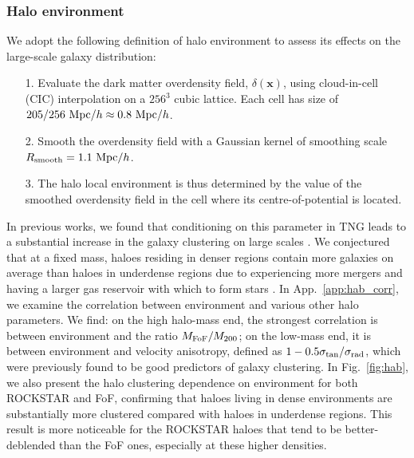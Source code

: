 \documentclass[fleqn,usenatbib]{mnras}
\newcommand{\rss}[1]{\textcolor{purple}{(rss: #1)}}
\begin{document}
\subsubsection{Halo environment}
We adopt the following definition of halo environment to assess its effects on the large-scale galaxy distribution:
\begin{itemize}
\item[1.] Evaluate the dark matter overdensity field, $\delta (\mathbf{x})$, using cloud-in-cell (CIC) interpolation on a $256^3$ cubic lattice. Each cell has size of $205/256 \ {\rm Mpc}/h \approx 0.8 \ {\rm Mpc}/h$.
\item[2.] Smooth the overdensity field with a Gaussian kernel of smoothing scale $R_{\rm smooth} = 1.1 \ {\rm Mpc}/h$.
\item[3.] The halo local environment is thus determined by the value of the smoothed overdensity field in the cell where its centre-of-potential is located.
\end{itemize}
In previous works, we found that conditioning on this parameter in TNG leads to a substantial increase in the galaxy clustering on large scales \citep{2020MNRAS.493.5506H,2021MNRAS.501.1603H}. We conjectured that at a fixed mass, haloes residing in denser regions contain more galaxies on average than haloes in underdense regions due to experiencing more mergers and having a larger gas reservoir with which to form stars \citep{2007MNRAS.378..641A,2017A&A...598A.103P,2018MNRAS.476.5442P,2018MNRAS.473.2486S}. In App.~\ref{app:hab_corr}, we examine the correlation between environment and various other halo parameters. We find: on the high halo-mass end, the strongest correlation is between environment and the ratio $M_{\rm FoF}/M_{\rm 200}$; 
on the low-mass end, it is between environment and velocity anisotropy, defined as $1-0.5\sigma_{\rm tan}/\sigma_{\rm rad}$, which were previously found to be good predictors of galaxy clustering. In Fig.~\ref{fig:hab}, we also present the halo clustering dependence on environment for both \textsc{ROCKSTAR} and FoF, confirming that haloes living in dense environments are substantially more clustered compared with haloes in underdense regions. This result is more noticeable for the \textsc{ROCKSTAR} haloes that tend to be better-deblended than the FoF ones, especially at these higher densities.
\end{document}
